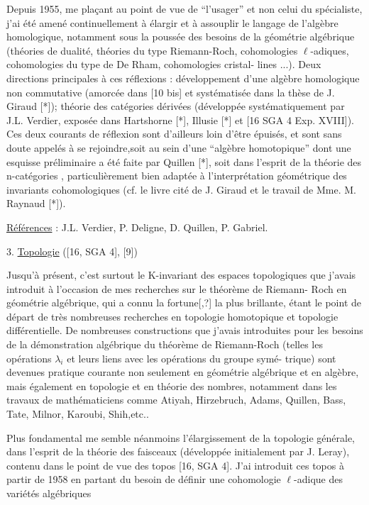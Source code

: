 \documentclass[11pt]{article}
\newcommand{\uline}[1]{\underline{#1}}
\newcommand{\unsure}[1]{[#1?]}
\begin{document}
Depuis 1955, me plaçant au point de vue de ``l'usager'' et non celui
du spécialiste, j'ai été amené continuellement à élargir et à assouplir le
langage de l'algèbre homologique, notamment sous la poussée des besoins de la
géométrie algébrique (théories de dualité, théories du type Riemann-Roch,
cohomologies $\ell$-adiques, cohomologies du type de De Rham, cohomologies cristal-%
lines ...). Deux directions principales à ces réflexions  : développement d'une
algèbre homologique non commutative (amorcée dans [10 bis] et systématisée
dans la thèse de J. Giraud [*]); théorie des catégories dérivées (développée
systématiquement par J.L. Verdier, exposée dans Hartshorne [*], Illusie [*]
et [16 SGA 4 Exp. XVIII]). Ces deux courants de réflexion sont d'ailleurs loin
d'être épuisés, et sont sans doute appelés à se rejoindre,soit au sein d'une
``algèbre homotopique'' dont une esquisse préliminaire a été faite par Quillen
[*], soit dans l'esprit de la théorie des n-catégories , particulièrement bien
adaptée à l'interprétation géométrique des invariants cohomologiques (cf. le
livre cité de J. Giraud et le travail de Mme. M. Raynaud [*]).

\uline{Références} : J.L. Verdier, P. Deligne, D. Quillen, P. Gabriel.

3. \uline{Topologie} ([16, SGA 4], [9])

Jusqu'à présent, c'est surtout le K-invariant des espaces topologiques
que j'avais introduit à l'occasion de mes recherches sur le théorème de Riemann-%
Roch en géométrie algébrique, qui a connu la fortune\unsure{,} la plus brillante, étant
le point de départ de très nombreuses recherches en topologie homotopique et
topologie différentielle. De nombreuses constructions que j'avais introduites
pour les besoins de la démonstration algébrique du théorème de Riemann-Roch
(telles les opérations  $\lambda_i$  et leurs liens avec les opérations du groupe symé-%
trique) sont devenues pratique courante non seulement en géométrie algébrique
et en algèbre, mais également en topologie et en théorie des nombres, notamment
dans les travaux de mathématiciens comme Atiyah, Hirzebruch, Adams, Quillen,
Bass, Tate, Milnor, Karoubi, Shih,etc..

Plus fondamental me semble néanmoins  l'élargissement de la
topologie générale, dans l'esprit de la théorie des faisceaux (développée
initialement par J. Leray), contenu dans le point de vue des topos
[16, SGA 4]. J'ai introduit ces topos à partir de 1958 en partant du
besoin de définir une cohomologie  $\ell$-adique  des variétés algébriques
\end{document}

